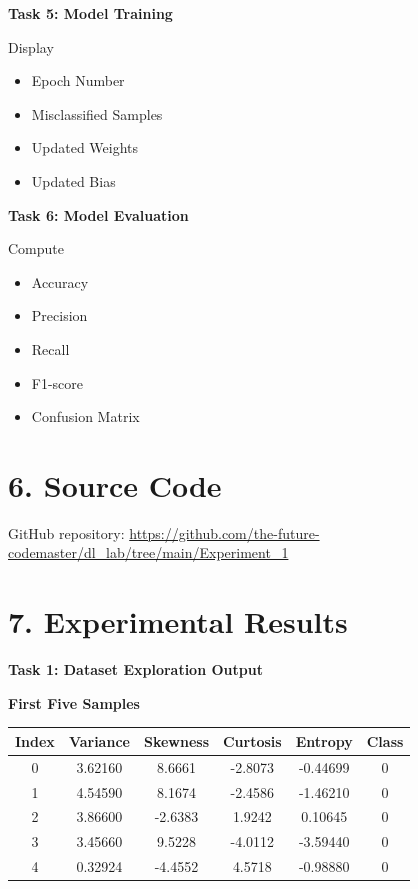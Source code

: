 \documentclass[11pt]{article}
\begin{document}
\vspace{2mm}

\textbf{Task 5: Model Training}

Display

\begin{itemize}
\item Epoch Number
\item Misclassified Samples
\item Updated Weights
\item Updated Bias
\end{itemize}

\vspace{2mm}

\textbf{Task 6: Model Evaluation}

Compute

\begin{itemize}
\item Accuracy
\item Precision
\item Recall
\item F1-score
\item Confusion Matrix
\end{itemize}

\section*{6. Source Code}
GitHub repository:
\url{https://github.com/the-future-codemaster/dl_lab/tree/main/Experiment_1}


\section*{7. Experimental Results}

\textbf{Task 1: Dataset Exploration Output}

\vspace{4mm}
\noindent\textbf{First Five Samples}

\vspace{2mm}
\noindent\begin{tabular}{|c|c|c|c|c|c|}
\hline
\textbf{Index} & \textbf{Variance} & \textbf{Skewness} & \textbf{Curtosis} & \textbf{Entropy} & \textbf{Class}\\
\hline
0 & 3.62160 & 8.6661 & -2.8073 & -0.44699 & 0 \\
1 & 4.54590 & 8.1674 & -2.4586 & -1.46210 & 0 \\
2 & 3.86600 & -2.6383 & 1.9242 & 0.10645 & 0 \\
3 & 3.45660 & 9.5228 & -4.0112 & -3.59440 & 0 \\
4 & 0.32924 & -4.4552 & 4.5718 & -0.98880 & 0 \\
\hline
\end{tabular}
\end{document}
